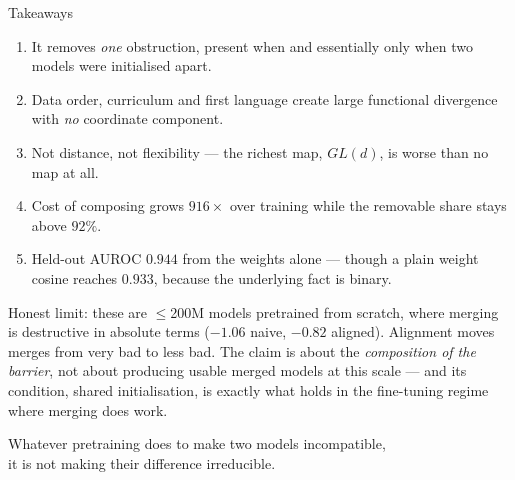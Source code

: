 \documentclass{beamer}
\begin{document}
\begin{frame}{Takeaways}
  \begin{enumerate}
    \item {} It removes \emph{one} obstruction,
          present when and essentially only when two models were initialised apart.
    \item {} Data order, curriculum and first
          language create large functional divergence with \emph{no} coordinate component.
    \item {} Not distance, not flexibility --- the
          richest map, $GL(d)$, is worse than no map at all.
    \item {} Cost of composing grows
          $916\times$ over training while the removable share stays above $92\%$.
    \item {} Held-out AUROC $0.944$ from the weights alone --- though
          a plain weight cosine reaches $0.933$, because the underlying fact is binary.
  \end{enumerate}
  \vfill
  {\footnotesize \alert{Honest limit:} these are $\leq$200M models pretrained from scratch, where
  merging is destructive in absolute terms ($-1.06$ naive, $-0.82$ aligned). Alignment moves merges
  from very bad to less bad. The claim is about the \emph{composition of the barrier}, not about
  producing usable merged models at this scale --- and its condition, shared initialisation, is
  exactly what holds in the fine-tuning regime where merging does work.}
\end{frame}

\begin{frame}{}
  \vfill
  \begin{block}{}
    \centering\large
    Whatever pretraining does to make two models incompatible,\\
    it is not making their difference \alert{irreducible}.
  \end{block}
  \vfill
  \vfill
\end{frame}
\end{document}
